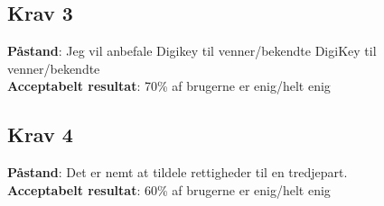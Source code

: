 \documentclass[12pt]{article}
\begin{document}
\subsection*{Krav 3}
\textbf{Påstand}: Jeg vil anbefale Digikey til venner/bekendte DigiKey til venner/bekendte\\
\textbf{Acceptabelt resultat}: 70\% af brugerne er enig/helt enig
\subsection*{Krav 4}
\textbf{Påstand}: Det er nemt at tildele rettigheder til en tredjepart.\\
\textbf{Acceptabelt resultat}: 60\% af brugerne er enig/helt enig
\end{document}
